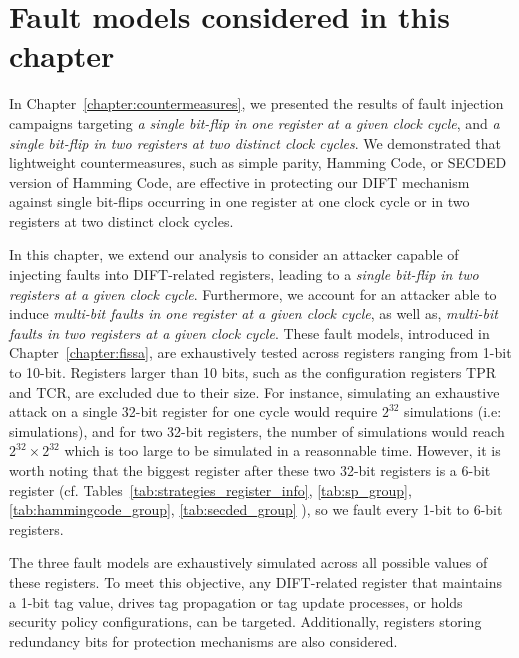 \section{Fault models considered in this chapter}
\label{section:chap6_faultmodels}
In Chapter~\ref{chapter:countermeasures}, we presented the results of fault injection campaigns targeting \textit{a single bit-flip in one register at a given clock cycle}, and \textit{a single bit-flip in two registers at two distinct clock cycles}. We demonstrated that lightweight countermeasures, such as simple parity, Hamming Code, or SECDED version of Hamming Code, are effective in protecting our DIFT mechanism against single bit-flips occurring in one register at one clock cycle or in two registers at two distinct clock cycles.

In this chapter, we extend our analysis to consider an attacker capable of injecting faults into DIFT-related registers, leading to a \textit{single bit-flip in two registers at a given clock cycle}. Furthermore, we account for an attacker able to induce \textit{multi-bit faults in one register at a given clock cycle}, as well as, \textit{multi-bit faults in two registers at a given clock cycle}. These fault models, introduced in Chapter~\ref{chapter:fissa}, are exhaustively tested across registers ranging from 1-bit to 10-bit. Registers larger than 10 bits, such as the configuration registers TPR and TCR, are excluded due to their size. For instance, simulating an exhaustive attack on a single 32-bit register for one cycle would require $2^{32}$ simulations (i.e:  simulations), and for two 32-bit registers, the number of simulations would reach $2^{32} \times 2^{32}$ which is too large to be simulated in a reasonnable time. However, it is worth noting that the biggest register after these two 32-bit registers is a 6-bit register (cf. Tables~\ref{tab:strategies_register_info}, \ref{tab:sp_group}, \ref{tab:hammingcode_group}, \ref{tab:secded_group} ), so we fault every 1-bit to 6-bit registers.

The three fault models are exhaustively simulated across all possible values of these registers. To meet this objective, any DIFT-related register that maintains a 1-bit tag value, drives tag propagation or tag update processes, or holds security policy configurations, can be targeted. Additionally, registers storing redundancy bits for protection mechanisms are also considered.

